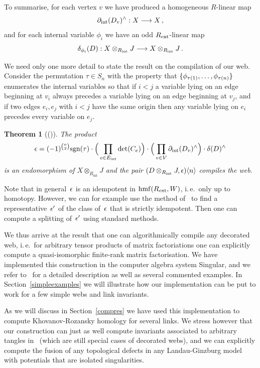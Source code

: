 \documentclass{compositio}
\newtheorem{theorem}{Theorem}[section]
\theoremstyle{definition}
\numberwithin{equation}{section}
\begin{document}
To summarise, for each vertex $v$ we have produced a homogeneous $R$-linear map
$$
\partial_{\text{int}}(D_v)^{\wedge}: X \longrightarrow X \, ,
$$
and for each internal variable $\phi_i$ we have an odd $R_{\text{ext}}$-linear map
$$
\delta_{\phi_i}(D): X \otimes_{R_{\text{int}}} J \longrightarrow X \otimes_{R_{\text{int}}} J \, .
$$

We need only one more detail to state the result on the compilation of our web. Consider the permutation $\tau\in S_{n}$ with the property that $\{ \phi_{\tau(1)}, \ldots, \phi_{\tau(n)} \}$ enumerates the internal variables so that if $i < j$ a variable lying on an edge beginning at $v_i$ always precedes a variable lying on an edge beginning at $v_j$, and if two edges $e_i, e_j$ with $i < j$ have the same origin then any variable lying on $e_i$ precedes every variable on $e_j$. 

\begin{theorem}[(\cite{dm1102.2957})] The product
\begin{equation}
\label{idempotent}
\epsilon = (-1)^{\binom{n}{2}} \textup{sgn}(\tau) \cdot \Big( \prod_{e\in E_{\text{int}}} \det(C_{e})\Big) \cdot \Big(\prod_{v \in V} \partial_{\text{int}}(D_v)^{\wedge}\Big) \cdot \delta(D)^{\wedge}
\end{equation}
is an endomorphism of $X \otimes_{R_{\text{int}}} J$ and the pair $(D \otimes_{R_{\text{int}}} J, \epsilon)\langle n\rangle$ compiles the web.
\end{theorem}

Note that in general~$\epsilon$ is an idempotent in $\operatorname{hmf}(R_{\text{ext}},W)$, i.\,e.~only up to homotopy. However, we can for example use the method of~\cite[Section~3.6]{LambekRingsModules} to find a representative~$\epsilon'$ of the class of~$\epsilon$ that is strictly idempotent. Then one can compute a splitting of~$\epsilon'$ using standard methods. 

We thus arrive at the result that one can algorithmically compile any decorated web, i.\,e.~for arbitrary tensor products of matrix factoriations one can explicitly compute a quasi-isomorphic finite-rank matrix factorisation. We have implemented this construction in the computer algebra system Singular, and we refer to~\cite{cmWebCompileCode} for a detailed description as well as several commented examples. In Section~\ref{simpleexamples} we will illustrate how our implementation can be put to work for a few simple webs and link invariants. 

As we will discuss in Section~\ref{compres} we have used this implementation to compute Khovanov-Rozansky homology for several links. We stress however that our construction can just as well compute invariants associated to arbitrary tangles in~\cite{kr0401268} (which are still special cases of decorated webs), and we can explicitly compute the fusion of any topological defects in any Landau-Ginzburg model with potentials that are isolated singularities.
\end{document}
